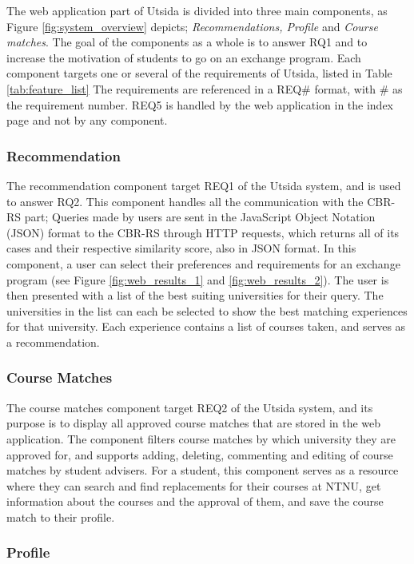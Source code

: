 The web application part of Utsida is divided into three main components, as Figure \ref{fig:system_overview} depicts; \emph{Recommendations, Profile} and \emph{Course matches}. The goal of the components as a whole is to answer RQ1 and to increase the motivation of students to go on an exchange program. Each component targets one or several of the requirements of Utsida, listed in Table \ref{tab:feature_list} The requirements are referenced in a REQ\# format, with \# as the requirement number. REQ5 is handled by the web application in the index page and not by any component.

\subsubsection{Recommendation}

The recommendation component target REQ1 of the Utsida system, and is used to answer RQ2. This component handles all the communication with the CBR-RS part; Queries made by users are sent in the JavaScript Object Notation (JSON) format to the CBR-RS through HTTP requests, which returns all of its cases and their respective similarity score, also in JSON format. In this component, a user can select their preferences and requirements for an exchange program (see Figure \ref{fig:web_results_1} and \ref{fig:web_results_2}). The user is then presented with a list of the best suiting universities for their query. The universities in the list can each be selected to show the best matching experiences for that university. Each experience contains a list of courses taken, and serves as a recommendation.

\subsubsection{Course Matches}\label{sec_course_matches}

The course matches component target REQ2 of the Utsida system, and its purpose is to display all approved course matches that are stored in the web application. The component filters course matches by which university they are approved for, and supports adding, deleting, commenting and editing of course matches by student advisers. For a student, this component serves as a resource where they can search and find replacements for their courses at NTNU, get information about the courses and the approval of them, and save the course match to their profile.

\subsubsection{Profile}

